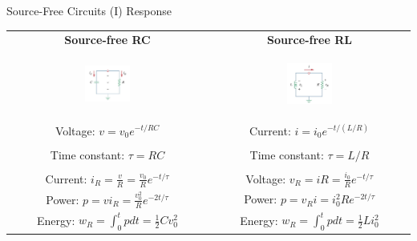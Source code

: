 \documentclass{beamer}
\begin{document}
\begin{frame}{Source-Free Circuits (I) Response}


\begin{table}[]
    \centering
    \begin{small}
    \setlength{\tabcolsep}{5mm}
    \begin{tabular}{c|c}
        \textbf{Source-free RC} & \textbf{Source-free RL}\\
        \begin{figure}
        \centering
        \includegraphics[width=0.35\textwidth]{img_1order/1_source-free_RC.jpg}
        \end{figure}
        &
        \begin{figure}
        \centering
        \includegraphics[width=0.35\textwidth]{img_1order/2_source-free_RL.jpg}
        \end{figure}
        \\
        Voltage: $v = v_0 e^{-t/RC}$&Current: $i = i_0 e^{-t/(L/R)}$\\
        &\\
        Time constant: $\tau = RC$&Time constant: $\tau = L/R$\\
        &\\
        Current: $i_R=\frac{v}{R}=\frac{v_0}{R}e^{-t/\tau}$&Voltage: $v_R=iR=\frac{i_0}{R}e^{-t/\tau}$\\
        Power: $p=vi_R=\frac{v_0^2}{R}e^{-2t/\tau}$&Power: $p=v_Ri=i_0^2Re^{-2t/\tau}$\\
        Energy: $w_R = \int_0^tpdt = \frac12Cv_0^2$&Energy: $w_R = \int_0^tpdt = \frac12Li_0^2$\\
    \end{tabular}
    \end{small}
\end{table}



\end{frame}
\end{document}
